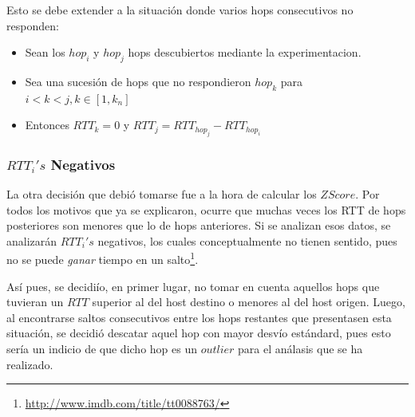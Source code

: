\par Esto se debe extender a la situaci\'on donde varios hops consecutivos
no responden: 

\begin{itemize}
    \item Sean los $hop_i$ y $hop_j$ hops descubiertos mediante
    la experimentacion.
    \smallskip

    \item Sea una sucesi\'on de hops que no respondieron $hop_k$
    para $i < k <j,k\in[1,k_n]$
    \medskip

    \item Entonces $RTT_k = 0$ y $RTT_j = RTT_{hop_j} - RTT_{hop_i}$
\end{itemize}

\subsubsection*{$RTT_i's$ Negativos}
\par La otra decisi\'on que debi\'o tomarse fue a la hora de calcular los $ZScore$.
Por todos los motivos que ya se explicaron, ocurre que muchas veces los RTT
de hops posteriores son menores que lo de hops anteriores. Si se analizan esos datos,
se analizar\'an $RTT_i's$ negativos, los cuales conceptualmente no tienen sentido, pues
no se puede \emph{ganar} tiempo en un salto\footnote{\url{http://www.imdb.com/title/tt0088763/}}.

\par As\'i pues, se decidi\'io, en primer lugar, no tomar en cuenta aquellos hops
que tuvieran un $RTT$ superior al del host destino o menores al del host origen. Luego,
al encontrarse saltos consecutivos entre los hops restantes que presentasen esta situaci\'on,
se decidi\'o descatar aquel hop con mayor desv\'io est\'andard, pues esto ser\'ia un
indicio de que dicho hop es un $outlier$ para el an\'alasis que se ha realizado.

